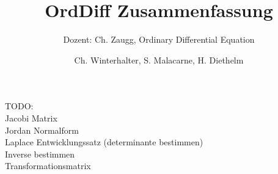 \documentclass{scrartcl}
\title{OrdDiff Zusammenfassung}
\subtitle{Dozent: Ch. Zaugg, Ordinary Differential Equation}
\author{Ch. Winterhalter, S. Malacarne, H. Diethelm}
\begin{document}

\lstset{language=Matlab}

\maketitle
\newpage

\tableofcontents
\newpage


\setcounter{section}{0}

TODO: \\
Jacobi Matrix\\
Jordan Normalform\\
Laplace Entwicklungssatz (determinante bestimmen)\\
Inverse bestimmen \\
Transformationsmatrix






\end{document}
